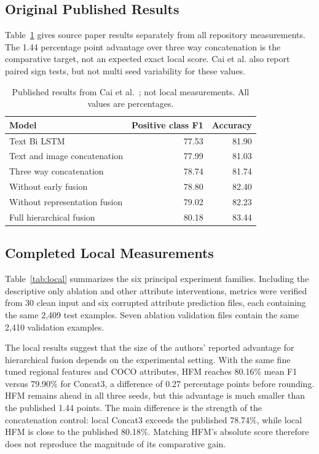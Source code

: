 \documentclass[conference]{IEEEtran}
\begin{document}
\subsection{Original Published Results}
Table~\ref{tab:published} gives source paper results separately from all repository measurements. The 1.44 percentage point advantage over three way concatenation is the comparative target, not an expected exact local score. Cai et al. also report paired sign tests, but not multi seed variability for these values.

\begin{table}[t]
\caption{Published results from Cai et al.~\cite{cai2019}; not local measurements. All values are percentages.}
\label{tab:published}
\centering
\footnotesize
\begin{tabular}{lrr}
\hline
Model & Positive class F1 & Accuracy\\
\hline
Text Bi LSTM & 77.53 & 81.90\\
Text and image concatenation & 77.99 & 81.03\\
Three way concatenation & 78.74 & 81.74\\
Without early fusion & 78.80 & 82.40\\
Without representation fusion & 79.02 & 82.23\\
Full hierarchical fusion & 80.18 & 83.44\\
\hline
\end{tabular}
\end{table}

\subsection{Completed Local Measurements}
Table~\ref{tab:local} summarizes the six principal experiment families. Including the descriptive only ablation and other attribute interventions, metrics were verified from 30 clean input and six corrupted attribute prediction files, each containing the same 2,409 test examples. Seven ablation validation files contain the same 2,410 validation examples. 

\begin{table}[t]
\caption{Local test results, mean $\pm$ sample standard deviation over seeds 42, 43, and 44. All metrics are percentages.}
\label{tab:local}
\centering

\end{table}

The local results suggest that the size of the authors' reported advantage for hierarchical fusion depends on the experimental setting. With the same fine tuned regional features and COCO attributes, HFM reaches 80.16\% mean F1 versus 79.90\% for Concat3, a difference of 0.27 percentage points before rounding. HFM remains ahead in all three seeds, but this advantage is much smaller than the published 1.44 points. The main difference is the strength of the concatenation control: local Concat3 exceeds the published 78.74\%, while local HFM is close to the published 80.18\%. Matching HFM's absolute score therefore does not reproduce the magnitude of its comparative gain.
\end{document}
